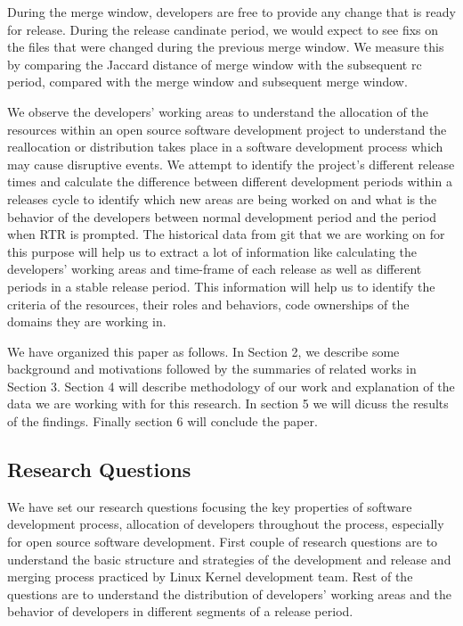\documentclass{acm_proc_article-sp}
\begin{document}
During the merge window, developers are free to provide any change that is ready for release. During the release candinate period, we would expect to see fixs on the files that were changed during the previous merge window. We measure this by comparing the Jaccard distance of merge window with the subsequent rc period, compared with the merge window and subsequent merge window.

We observe the developers' working areas to understand the allocation of the resources within an open source software development project to understand the reallocation or distribution takes place in a software development process which may cause disruptive events. We attempt to identify the project's different release times and calculate the difference between different development periods within a releases cycle to identify which new areas are being worked on and what is the behavior of the developers between normal development period and the period when RTR is prompted. The historical data from git that we are working on for this purpose will help us to extract a lot of information like calculating the developers' working areas and time-frame of each release as well as different periods in a stable release period. This information will help us to identify the criteria of the resources, their roles and behaviors, code ownerships of the domains they are working in.

We have organized this paper as follows. In Section 2, we describe some background and motivations followed by the summaries of related works in Section 3. Section 4 will describe methodology of our work and explanation of the data we are working with for this research. In section 5 we will dicuss the results of the findings. Finally section 6 will conclude the paper.

\subsection{Research Questions}
We have set our research questions focusing the key properties of software development process, allocation of developers throughout the process, especially for open source software development. First couple of research questions are to understand the basic structure and strategies of the development and release and merging process practiced by Linux Kernel development team. Rest of the questions are to understand the distribution of developers' working areas and the behavior of developers in different segments of a release period.
\end{document}
